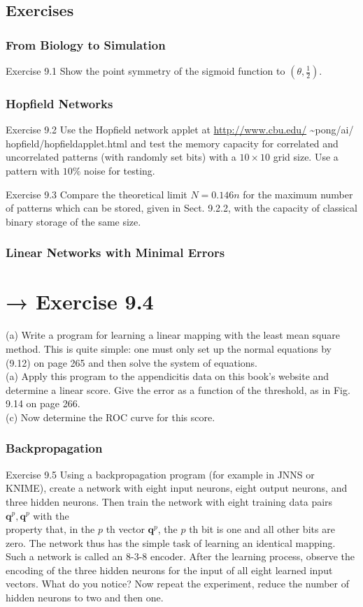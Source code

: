 \documentclass[10pt]{book}
\begin{document}
\subsection*{Exercises}
\subsubsection*{From Biology to Simulation}
Exercise 9.1 Show the point symmetry of the sigmoid function to $\left(\theta, \frac{1}{2}\right)$.

\subsubsection*{Hopfield Networks}
Exercise 9.2 Use the Hopfield network applet at \href{http://www.cbu.edu/}{http://www.cbu.edu/} \~{}pong/ai/ hopfield/hopfieldapplet.html and test the memory capacity for correlated and uncorrelated patterns (with randomly set bits) with a $10 \times 10$ grid size. Use a pattern with $10 \%$ noise for testing.

Exercise 9.3 Compare the theoretical limit $N=0.146 n$ for the maximum number of patterns which can be stored, given in Sect. 9.2.2, with the capacity of classical binary storage of the same size.

\subsubsection*{Linear Networks with Minimal Errors}
\section*{→ Exercise 9.4}
(a) Write a program for learning a linear mapping with the least mean square method. This is quite simple: one must only set up the normal equations by (9.12) on page 265 and then solve the system of equations.\\
(a) Apply this program to the appendicitis data on this book's website and determine a linear score. Give the error as a function of the threshold, as in Fig. 9.14 on page 266.\\
(c) Now determine the ROC curve for this score.

\subsubsection*{Backpropagation}
Exercise 9.5 Using a backpropagation program (for example in JNNS or KNIME), create a network with eight input neurons, eight output neurons, and three hidden neurons. Then train the network with eight training data pairs $\boldsymbol{q}^{p}, \boldsymbol{q}^{p}$ with the\\
property that, in the $p$ th vector $\boldsymbol{q}^{p}$, the $p$ th bit is one and all other bits are zero. The network thus has the simple task of learning an identical mapping. Such a network is called an 8-3-8 encoder. After the learning process, observe the encoding of the three hidden neurons for the input of all eight learned input vectors. What do you notice? Now repeat the experiment, reduce the number of hidden neurons to two and then one.
\end{document}
